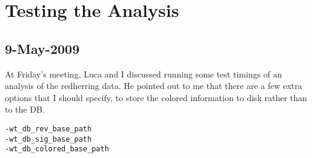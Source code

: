 \section{Testing the Analysis}

\subsection{9-May-2009}

At Friday's meeting, Luca and I discussed running some test timings
of an analysis of the redherring data.
He pointed out to me that there are a few extra options that
I should specify, to store the colored information to disk
rather than to the DB.
\begin{verbatim}
-wt_db_rev_base_path
-wt_db_sig_base_path
-wt_db_colored_base_path
\end{verbatim}

